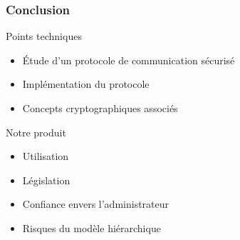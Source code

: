 \begin{frame}
\frametitle{Conclusion}
Points techniques
\begin{itemize}
\item Étude d'un protocole de communication sécurisé
\item Implémentation du protocole
\item Concepts cryptographiques associés
\end{itemize}

Notre produit
\begin{itemize}
\item Utilisation
\item Législation
\item Confiance envers l'administrateur
\item Risques du modèle hiérarchique
\end{itemize}
\end{frame}
